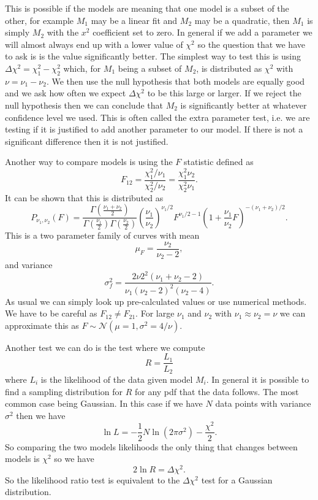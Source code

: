 \documentclass[a4paper]{article}
\newcommand{\distributed}{\sim}
\newcommand{\normal}{\mathcal{N}}
\begin{document}
    This is possible if the models are  meaning that one model is a subset of the other, for example \(M_1\) may be a linear fit and \(M_2\) may be a quadratic, then \(M_1\) is simply \(M_2\) with the \(x^2\) coefficient set to zero.
    In general if we add a parameter we will almost always end up with a lower value of \(\chi^2\) so the question that we have to ask is is the value significantly better.
    The simplest way to test this is using \(\Delta\chi^2 = \chi_1^2 - \chi_2^2\) which, for \(M_1\) being a subset of \(M_2\), is distributed as \(\chi^2\) with \(\nu = \nu_1 - \nu_2\).
    We then use the null hypothesis that both models are equally good and we ask how often we expect \(\Delta\chi^2\) to be this large or larger.
    If we reject the null hypothesis then we can conclude that \(M_2\) is significantly better at whatever confidence level we used.
    This is often called the extra parameter test, i.e. we are testing if it is justified to add another parameter to our model.
    If there is not a significant difference then it is not justified.
    
    Another way to compare models is using the \(F\) statistic defined as
    \[F_{12} = \frac{\chi^2_1/\nu_1}{\chi^2_2/\nu_2} = \frac{\chi^2_1\nu_2}{\chi^2_2\nu_1}.\]
    It can be shown that this is distributed as
    \[P_{\nu_1, \nu_2}(F) = \frac{\Gamma\left(\frac{\nu_1 + \nu_2}{2}\right)}{\Gamma\left(\frac{\nu_1}{2}\right)\Gamma\left(\frac{\nu_2}{2}\right)} \left(\frac{\nu_1}{\nu_2}\right)^{\nu_1/2}F^{\nu_1/2 - 1}\left(1 + \frac{\nu_1}{\nu_2}F\right)^{-(\nu_1+\nu_2)/2}.\]
    This is a two parameter family of curves with mean
    \[\mu_F = \frac{\nu_2}{\nu_2 - 2},\]
    and variance
    \[\sigma_f^2 = \frac{2\nu2^2(\nu_1 + \nu_2 - 2)}{\nu_1(\nu_2 - 2)^2(\nu_2 - 4)}.\]
    As usual we can simply look up pre-calculated values or use numerical methods.
    We have to be careful as \(F_{12} \ne F_{21}\).
    For large \(\nu_1\) and \(\nu_2\) with \(\nu_1 \approx \nu_2 = \nu\) we can approximate this as \(F\distributed\normal(\mu = 1, \sigma^2 = 4/\nu)\).
    
    Another test we can do is the  test where we compute
    \[R = \frac{L_1}{L_2}\]
    where \(L_i\) is the likelihood of the data given model \(M_i\).
    In general it is possible to find a sampling distribution for \(R\) for any \gls{pdf} that the data follows.
    The most common case being Gaussian.
    In this case if we have \(N\) data points with variance \(\sigma^2\) then we have
    \[\ln L = -\frac{1}{2}N\ln(2\pi\sigma^2) - \frac{\chi^2}{2}.\]
    So comparing the two models likelihoods the only thing that changes between models is \(\chi^2\) so we have
    \[2\ln R = \Delta\chi^2.\]
    So the likelihood ratio test is equivalent to the \(\Delta\chi^2\) test for a Gaussian distribution.
    
\end{document}
